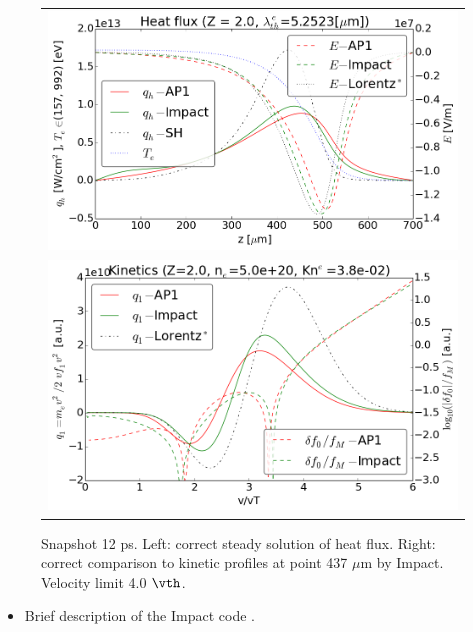 \begin{figure}[tbh]
  \begin{center}
    \begin{tabular}{c}
      \includegraphics[width=\figscale\textwidth]{../VFPdata/C7_Impact_case3_heatflux.png} \\
      \includegraphics[width=\figscale\textwidth]{../VFPdata/C7_Impact_case3_kinetics.png}
    \end{tabular}
  \caption{  
  Snapshot 12 ps. Left: correct steady solution of heat flux. 
  Right: correct comparison to kinetic profiles at point 437 $\mu$m by Impact.
  Velocity limit 4.0 $\vth$.
  }
  \label{fig:C7_Impact_case3}
  \end{center} 
\end{figure}

\begin{itemize}
  \item Brief description of the Impact code .
\end{itemize}

